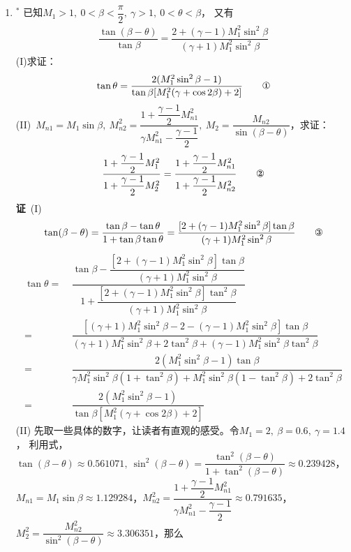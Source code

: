\begin{enumerate}[label={【\textbf{例\thechapter.\arabic*}】},
 leftmargin=\inteval{\myenumleftmargin}pt,
 itemsep=\inteval{\myenumitempsep}pt,
 itemindent=\inteval{\myenumitemindent}pt]
\item $ ^* $ 
已知$ M_1>1,\ 0<\beta<\dfrac{\pi}{2},\ \gamma>1,\ 0<\theta<\beta $，
又有
\begin{align*}
    \dfrac{\tan(\beta-\theta)}{\tan\beta}=\dfrac{2+(\gamma-1)M_1^2\sin^2\beta
    }{(\gamma+1)M_1^2\sin^2\beta}
\end{align*}
(I)求证：
\begin{align}
    \tan\theta=\dfrac{2(M_1^2\sin^2\beta-1)}{\tan\beta[M_1^2(\gamma+\cos2\beta)+2]}  \tag*{\ding{172}}
\end{align} 
(II)\ $ M_{n1}=M_1\sin\beta,\ M_{n2}^2=\dfrac{1+\dfrac{\gamma-1}{2}M_{n1}^2}{
    \gamma M_{n1}^2-\dfrac{\gamma-1}{2}},\ M_2=\dfrac{M_{n2}}{\sin(\beta-
    \theta)} $，求证：
\begin{align}
    \dfrac{1+\dfrac{\gamma-1}{2}M_1^2}{1+\dfrac{\gamma-1}{2}M_2^2}=
    \dfrac{1+\dfrac{\gamma-1}{2}M_{n1}^2}{1+\dfrac{\gamma-1}{2}M_{n2}^2}  \tag*{\ding{173}}
\end{align}
\textbf{证}\ (I)
\begin{align}
    \tan(\beta-\theta)=\dfrac{\tan\beta-\tan\theta}{1+\tan\beta\tan\theta}=
    \dfrac{[2+(\gamma-1)M_1^2\sin^2\beta]
        \tan\beta}{(\gamma+1)M_1^2\sin^2\beta} \tag*{\ding{174}}
\end{align}
\begin{align*}
    \tan\theta
    =&\ \dfrac{\tan\beta-\dfrac{[2+(\gamma-1)M_1^2\sin^2\beta]
            \tan\beta}{(\gamma+1)M_1^2\sin^2\beta}}
    {1+\dfrac{[2+(\gamma-1)M_1^2\sin^2\beta]
            \tan^2\beta}{(\gamma+1)M_1^2\sin^2\beta}} \\
    =&\ \dfrac{[(\gamma+1)M_1^2\sin^2\beta-2-(\gamma-1)M_1^2\sin^2\beta]\tan\beta}
    {(\gamma+1)M_1^2\sin^2\beta+2\tan^2\beta+(\gamma-1)M_1^2\sin^2\beta\tan^2\beta} \\
    =&\ \dfrac{2(M_1^2\sin^2\beta-1)\tan\beta}{\gamma M_1^2\sin^2\beta(1+\tan^2\beta)+
        M_1^2\sin^2\beta(1-\tan^2\beta)+2\tan^2\beta } \\
    =&\ \dfrac{2(M_1^2\sin^2\beta-1)}{\tan\beta[M_1^2(\gamma+\cos2\beta)+2]}
\end{align*}
(II) 先取一些具体的数字，让读者有直观的感受。令$ M_1=2,\ \beta=0.6,\ \gamma=1.4 $，
利用式，$ \tan(\beta-\theta)\approx 0.561071,\ 
\sin^2(\beta-\theta)=\dfrac{\tan^2(\beta-\theta)}{1+\tan^2(\beta-
    \theta)}\approx 0.239428 $，
$ M_{n1}=M_1\sin\beta\approx 1.129284 $，$ M_{n2}^2=\dfrac{
    1+\dfrac{\gamma-1}{2}M_{n1}^2}{\gamma M_{n1}^2
    -\dfrac{\gamma-1}{2}}\approx 0.791635 $，
$ M_2^2=\dfrac{M_{n2}^2}{\sin^2(\beta-\theta)}\approx 3.306351 $，那么

\end{enumerate}
